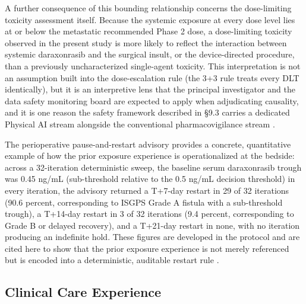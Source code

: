 A further consequence of this bounding relationship concerns the dose-limiting
toxicity assessment itself. Because the systemic exposure at every dose level lies
at or below the metastatic recommended Phase 2 dose, a dose-limiting toxicity
observed in the present study is more likely to reflect the interaction between
systemic daraxonrasib and the surgical insult, or the device-directed procedure,
than a previously uncharacterized single-agent toxicity. This interpretation is
not an assumption built into the dose-escalation rule (the 3+3 rule treats every
DLT identically), but it is an interpretive lens that the principal investigator
and the data safety monitoring board are expected to apply when adjudicating
causality, and it is one reason the safety framework described in \S 9.3 carries a
dedicated Physical AI stream alongside the conventional pharmacovigilance stream
\cite{phase1guidance, daraxwhipple}. 

The perioperative pause-and-restart advisory
provides a concrete, quantitative example of how the prior exposure experience is
operationalized at the bedside: across a 32-iteration deterministic sweep, the
baseline serum daraxonrasib trough was 0.45 ng/mL (sub-threshold relative to the
0.5 ng/mL decision threshold) in every iteration, the advisory returned a T+7-day
restart in 29 of 32 iterations (90.6 percent, corresponding to ISGPS Grade A
fistula with a sub-threshold trough), a T+14-day restart in 3 of 32 iterations
(9.4 percent, corresponding to Grade B or delayed recovery), and a T+21-day
restart in none, with no iteration producing an indefinite hold. These figures are
developed in the protocol and are cited here to show that the prior
exposure experience is not merely referenced but is encoded into a deterministic,
auditable restart rule \cite{onpremwhippl, daraxwhipple}.

\subsection{Clinical Care Experience}

